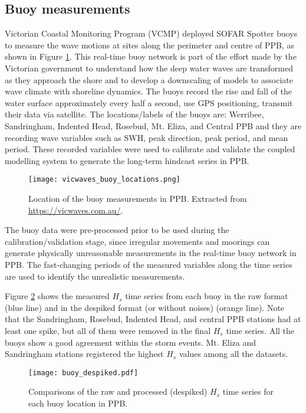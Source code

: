 \documentclass[12pt]{article}
\begin{document}

\subsection{Buoy measurements}

Victorian Coastal Monitoring Program (VCMP) deployed SOFAR Spotter buoys to measure the wave motions at sites along the perimeter and centre of PPB, as shown in Figure \ref{fig:buoy_measurements}. This real-time buoy network is part of the effort made by the Victorian government to understand how the deep water waves are transformed as they approach the shore and to develop a downscaling of models to associate wave climate with shoreline dynamics. The buoys record the rise and fall of the water surface approximately every half a second, use GPS positioning, transmit their data via satellite. The locations/labels of the buoys are: Werribee, Sandringham, Indented Head, Rosebud, Mt. Eliza, and Central PPB and they are recording wave variables such as SWH, peak direction, peak period, and mean period. These recorded variables were used to calibrate and validate the coupled modelling system to generate the long-term hindcast series in PPB.

\begin{figure}[h]
\centering
  \texttt{[image: vicwaves\_buoy\_locations.png]}
  \caption{Location of the buoy measurements in PPB. Extracted from \url{https://vicwaves.com.au/}.}
  \label{fig:buoy_measurements}
\end{figure}

The buoy data were pre-processed prior to be used during the calibration/validation stage, since irregular movements and moorings can generate physically unreasonable measurements in the real-time buoy network in PPB. The fast-changing periods of the measured variables along the time series are used to identify the unrealistic measurements. 

Figure \ref{fig:pre_processing} shows the  measured $H_{s}$ time series  from each buoy in the raw format (blue line) and in the despiked format (or without noises) (orange line). Note that the Sandringham, Rosebud, Indented Head, and central PPB stations had at least one spike, but all of them were removed in the final $H_{s}$ time series.  All the buoys show a good agreement within the storm events. Mt. Eliza and Sandringham stations registered the highest $H_{s}$ values among all the datasets.

\begin{figure}[h]
    \centering
    \texttt{[image: buoy\_despiked.pdf]}
    \caption{Comparisons of the raw and processed (despiked) $H_{s}$ time series for each buoy location in PPB.}
    \label{fig:pre_processing}
\end{figure}
\end{document}
